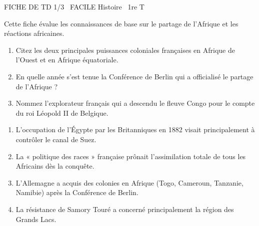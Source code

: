 \documentclass[11pt]{article}
\begin{document}
\begin{tcolorbox}[enhanced,colback=popink,colframe=popink,arc=10pt,boxrule=0pt,left=12pt,right=12pt,top=9pt,bottom=9pt]
{\color{white}\popxbold\small FICHE DE TD 1/3 \textbullet\ FACILE \hfill Histoire \textbullet\ 1re T\par}
\end{tcolorbox}
\vspace{4pt}
Cette fiche évalue les connaissances de base sur le partage de l'Afrique et les réactions africaines.

\begin{exercice}
\begin{enumerate}
    \item Citez les deux principales puissances coloniales françaises en Afrique de l'Ouest et en Afrique équatoriale.
    \item En quelle année s'est tenue la Conférence de Berlin qui a officialisé le partage de l'Afrique ?
    \item Nommez l'explorateur français qui a descendu le fleuve Congo pour le compte du roi Léopold II de Belgique.
\end{enumerate}
\end{exercice}

\begin{exercice}
\begin{enumerate}
    \item L'occupation de l'Égypte par les Britanniques en 1882 visait principalement à contrôler le canal de Suez.
    \item La « politique des races » française prônait l'assimilation totale de tous les Africains dès la conquête.
    \item L'Allemagne a acquis des colonies en Afrique (Togo, Cameroun, Tanzanie, Namibie) après la Conférence de Berlin.
    \item La résistance de Samory Touré a concerné principalement la région des Grands Lacs.
\end{enumerate}
\end{exercice}
\end{document}
